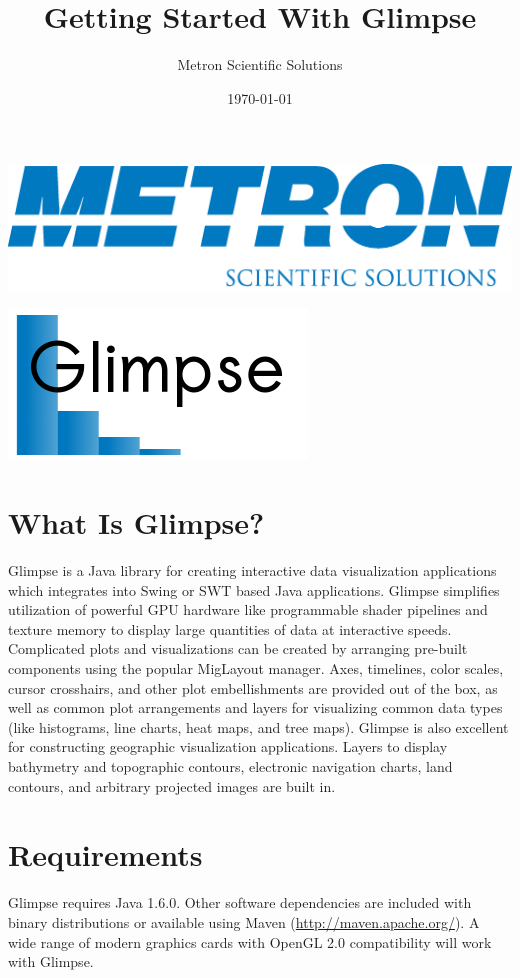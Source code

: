 \documentclass[12pt]{article}
\title{Getting Started With Glimpse}
\author{
        Metron Scientific Solutions\\
}
\date{\today}
\begin{document}
\maketitle

\begin{center}
\includegraphics[width=.4\textwidth]{images/MetronLogo.png}
\end{center}

\begin{center}
\includegraphics[width=.4\textwidth]{images/GlimpseLogo.png}
\end{center}

\section{What Is Glimpse?}

Glimpse is a Java library for creating interactive data visualization applications which integrates into Swing or SWT based Java applications. Glimpse simplifies utilization of powerful GPU hardware like programmable shader pipelines and texture memory to display large quantities of data at interactive speeds. Complicated plots and visualizations can be created by arranging pre-built components using the popular MigLayout manager. Axes, timelines, color scales, cursor crosshairs, and other plot embellishments are provided out of the box, as well as common plot arrangements and layers for visualizing common data types (like histograms, line charts, heat maps, and tree maps). Glimpse is also excellent for constructing geographic visualization applications. Layers to display bathymetry and topographic contours, electronic navigation charts, land contours, and arbitrary projected images are built in.

\section{Requirements}

Glimpse requires Java 1.6.0. Other software dependencies are included with binary distributions or available using Maven (\url{http://maven.apache.org/}). A wide range of modern graphics cards with OpenGL 2.0 compatibility will work with Glimpse.
\end{document}
